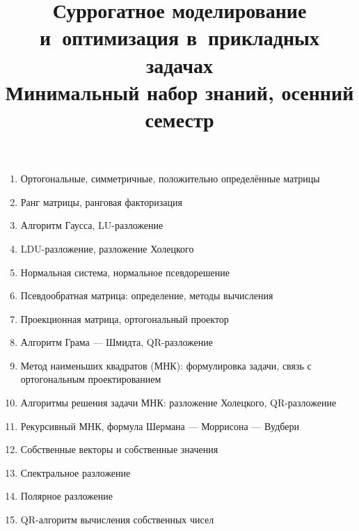 \documentclass[12pt,oneside,openany]{article}
\begin{document}
\title{
  \large
  \textbf{Суррогатное моделирование и~оптимизация в~прикладных задачах} \\
  Минимальный набор знаний, осенний семестр
}

\author{}
\date{}

\maketitle
\thispagestyle{empty}

\vspace{-10ex}


\begin{enumerate}

    \item Ортогональные, симметричные, положительно определённые матрицы
    \item Ранг матрицы, ранговая факторизация

    \item Алгоритм Гаусса, LU-разложение
    \item LDU-разложение, разложение Холецкого
    \item Нормальная система, нормальное псевдорешение
    \item Псевдообратная матрица: определение, методы вычисления

    \item Проекционная матрица, ортогональный проектор
    \item Алгоритм Грама --- Шмидта, QR-разложение

    \item Метод наименьших квадратов (МНК): формулировка задачи, связь с ортогональным проектированием
    \item Алгоритмы решения задачи МНК: разложение Холецкого, QR-разложение
    \item Рекурсивный МНК, формула Шермана --- Моррисона --- Вудбери

    \item Собственные векторы и собственные значения
    \item Спектральное разложение
    \item Полярное разложение
    \item QR-алгоритм вычисления собственных чисел


\end{enumerate}
\end{document}
